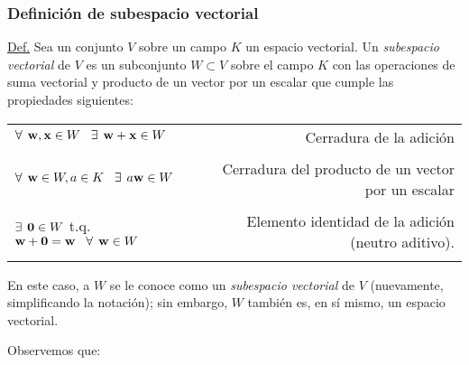 \documentclass[12pt]{article}
\begin{document}
\subsubsection{Definición de subespacio vectorial} \label{Def:Subespacio_vectorial}

\begin{tcolorbox}
\underline{Def.} Sea un conjunto $V$ sobre un campo $K$ un espacio vectorial. Un \textit{subespacio vectorial} de $V$ es un subconjunto $W\subset V$ sobre el campo $K$ con las operaciones de suma vectorial y producto de un vector por un escalar que cumple las propiedades siguientes:

\begin{center}
\begin{tabular}{lr}
    $\forall\hspace{1.5mm} \mathbf{w},\mathbf{x}\in W \hspace{3mm}\exists \hspace{1.5mm} \mathbf{w}+\mathbf{x}\in W$ & Cerradura de la adición \\ \\ \multirow{2}{0.4\textwidth}{$\forall\hspace{1.5mm} \mathbf{w}\in W, a\in K \hspace{3mm}\exists \hspace{1.5mm} a\mathbf{w}\in W$} & \multirow{2}{0.28\textwidth}{Cerradura del producto de un vector por un escalar} \\ \\ \\
    $\exists \hspace{1.5mm} \mathbf{0}\in W$ t.q. $\mathbf{w}+\mathbf{0}=\mathbf{w}\hspace{3mm}\forall\hspace{1.5mm} \mathbf{w} \in W$ & Elemento identidad de la adición (neutro aditivo). \\ \\
\end{tabular}
\end{center}

\hspace{2.5mm} En este caso, a $W$ se le conoce como un \textit{subespacio vectorial} de $V$ (nuevamente, simplificando la notación); sin embargo, $W$ también es, en sí mismo, un espacio vectorial.

\end{tcolorbox}{}

Observemos que:
\end{document}
